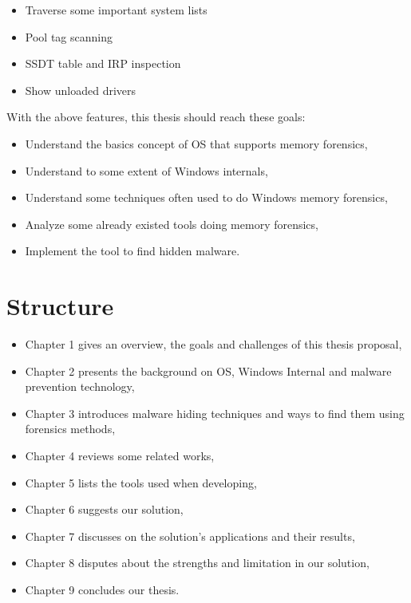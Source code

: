 \begin{itemize}
  \item Traverse some important system lists
  \item Pool tag scanning
  \item SSDT table and IRP inspection
  \item Show unloaded drivers
\end{itemize}

With the above features, this thesis should reach these goals:

\begin{itemize}
  \item Understand the basics concept of OS that supports memory forensics,
  \item Understand to some extent of Windows internals,
  \item Understand some techniques often used to do Windows memory forensics,
  \item Analyze some already existed tools doing memory forensics,
  \item Implement the tool to find hidden malware.
\end{itemize}

\section[Structure]{Structure}

\begin{itemize}
  \item Chapter 1 gives an overview, the goals and challenges of this thesis proposal,
  \item Chapter 2 presents the background on OS, Windows Internal and malware prevention technology,
  \item Chapter 3 introduces malware hiding techniques and ways to find them using forensics methods,
  \item Chapter 4 reviews some related works,
  \item Chapter 5 lists the tools used when developing,
  \item Chapter 6 suggests our solution,
  \item Chapter 7 discusses on the solution's applications and their results,
  \item Chapter 8 disputes about the strengths and limitation in our solution,
  \item Chapter 9 concludes our thesis.
\end{itemize}
